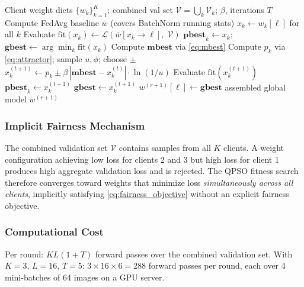 \documentclass[conference]{IEEEtran}
\begin{document}
\begin{algorithm}
\caption{FedQPSO server-side aggregation (round $r$)}
\label{alg:fedqpso}
\begin{algorithmic}[1]
\REQUIRE Client weight dicts $\{w_k\}_{k=1}^K$; combined val set
$\mathcal{V} = \bigcup_k \mathcal{V}_k$; $\beta$, iterations $T$
\STATE Compute FedAvg baseline $\bar{w}$ (covers BatchNorm running stats)
    \STATE $x_k \leftarrow w_k[\ell]$ for all $k$ \hfill {}
    \STATE Evaluate $\mathrm{fit}(x_k) \leftarrow \mathcal{L}(\bar{w}[x_k \to \ell],\;\mathcal{V})$
    \STATE $\mathbf{pbest}_k \leftarrow x_k$;\quad $\mathbf{gbest} \leftarrow \arg\min_k \mathrm{fit}(x_k)$
        \STATE Compute $\mathbf{mbest}$ via \eqref{eq:mbest}
            \STATE Compute $p_k$ via \eqref{eq:attractor}; sample $u,\phi$; choose $\pm$
            \STATE $x_k^{(t+1)} \leftarrow p_k \pm \beta\,|\mathbf{mbest}-x_k^{(t)}|\cdot\ln(1/u)$
            \STATE Evaluate $\mathrm{fit}(x_k^{(t+1)})$
                \STATE $\mathbf{pbest}_k \leftarrow x_k^{(t+1)}$
            \ENDIF
                \STATE $\mathbf{gbest} \leftarrow x_k^{(t+1)}$
            \ENDIF
        \ENDFOR
    \ENDFOR
    \STATE $w^{(r+1)}[\ell] \leftarrow \mathbf{gbest}$
    \hfill {}
\ENDFOR
\RETURN assembled global model $w^{(r+1)}$
\end{algorithmic}
\end{algorithm}

\subsubsection{Implicit Fairness Mechanism}
The combined validation set $\mathcal{V}$ contains samples from all $K$
clients. A weight configuration achieving low loss for clients 2 and 3 but
high loss for client 1 produces high aggregate validation loss and is
rejected. The QPSO fitness search therefore converges toward weights that
minimize loss \emph{simultaneously across all clients}, implicitly satisfying
\eqref{eq:fairness_objective} without an explicit fairness objective.

\subsubsection{Computational Cost}
Per round: $KL(1+T)$ forward passes over the combined validation set.
With $K\!=\!3$, $L\!=\!16$, $T\!=\!5$: $3\times16\times6 = 288$ forward
passes per round, each over 4 mini-batches of 64 images on a GPU server.
\end{document}

